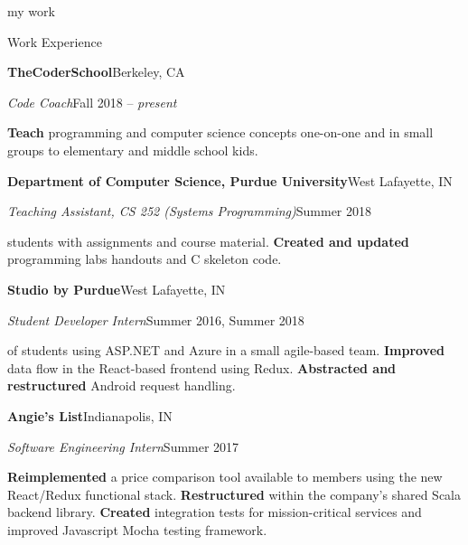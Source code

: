 \hfill\vrule\hfill{}
\begin{minipage}[t]{0.67\textwidth}
  {\Huge my work \phantom{me}}

  \vspace{10pt}

  {\sectionfont Work Experience}

  \vspace{5pt}
  \textbf{TheCoderSchool}\hfill Berkeley, CA
  \begin{adjustwidth}{10pt}{}
    \emph{Code Coach}\hfill Fall 2018 -- \emph{present}

    \textbf{Teach} programming and computer science concepts one-on-one and in small groups to elementary and middle school kids.
  \end{adjustwidth}

  \vspace{5pt}
  \textbf{Department of Computer Science, Purdue University}\hfill West Lafayette, IN
  \begin{adjustwidth}{10pt}{}
    \emph{Teaching Assistant, CS 252 (Systems Programming)}\hfill Summer 2018

    \textbf{} students with assignments and course material.
    \textbf{Created and updated} programming labs handouts and C skeleton code.
  \end{adjustwidth}

  \vspace{5pt}
  \textbf{Studio by Purdue}\hfill West Lafayette, IN
  \begin{adjustwidth}{10pt}{}
    \emph{Student Developer Intern}\hfill Summer 2016, Summer 2018

     of students using ASP.NET and Azure in a small agile-based team.
    \textbf{Improved} data flow in the React-based frontend using Redux.
    \textbf{Abstracted and restructured} Android request handling.
  \end{adjustwidth}

  \vspace{5pt}
  \textbf{Angie's List}\hfill Indianapolis, IN
  \begin{adjustwidth}{10pt}{}
    \emph{Software Engineering Intern}\hfill Summer 2017

    \textbf{Reimplemented} a price comparison tool available to members using the new React/Redux functional stack.
    \textbf{Restructured}  within the company's shared Scala backend library.
    \textbf{Created} integration tests for mission-critical services and improved Javascript Mocha testing framework.
  \end{adjustwidth}


\end{minipage}
